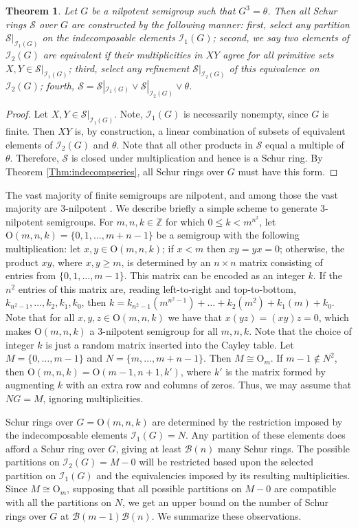 \documentclass{article}
\theoremstyle{plain}
\newtheorem{Thm}{Theorem}[section]
\theoremstyle{definition}
\newcommand{\thmref}[1]{Theorem \ref{#1}}
\renewcommand{\S}{\mathcal{S}}
\newcommand{\Z}{\mathbb{Z}}
\newcommand{\I}{\mathscr{I}}
\newcommand{\B}{\mathscr{B}}
\renewcommand{\O}{\mathrm{O}}
\begin{document}
\begin{Thm}\label{thm:nil3} Let $G$ be a nilpotent semigroup such that $G^3=\theta$. Then all Schur rings $\S$ over $G$ are constructed by the following manner: first, select any partition $\S|_{\I_1(G)}$ on the indecomposable elements $\I_1(G)$; second, we say two elements of $\I_2(G)$ are equivalent if their multiplicities in $XY$ agree for all primitive sets $X,Y\in \S|_{\I_1(G)}$; third, select any refinement $\S|_{\I_2(G)}$ of this equivalence on  $\I_2(G)$; fourth, $\S = \S|_{\I_1(G)}\vee \S|_{\I_2(G)}\vee \theta$.
\end{Thm}
\begin{proof}
    Let $X,Y\in \S|_{\I_1(G)}$. Note, $\I_1(G)$ is necessarily nonempty, since $G$ is finite. Then $XY$ is, by construction, a linear combination of subsets of equivalent elements of $\I_2(G)$ and $\theta$. Note that all other products in $\S$ equal a multiple of $\theta$. Therefore, $\S$ is closed under multiplication and hence is a Schur ring. By \thmref{Thm:indecompseries}, all Schur rings over $G$ must have this form.
\end{proof}

The vast majority of finite semigroups are nilpotent, and among those the vast majority are 3-nilpotent \cite{Distler}. We describe briefly a simple scheme to generate 3-nilpotent semigroups. For $m,n,k\in \Z$ for which $0\le k<m^{n^2}$, let \label{bigO}$\O(m,n,k) = \{0,1,\ldots, m+n-1\}$ be a semigroup with the following multiplication: let $x,y\in \O(m,n,k)$; if $x<m$ then $xy=yx=0$; otherwise, the product $xy$, where $x,y\ge m$, is determined by an $n\times n$ matrix consisting of entries from $\{0,1,\ldots, m-1\}$. This matrix can be encoded as an integer $k$. If the $n^2$ entries of this matrix are, reading left-to-right and top-to-bottom, $k_{n^2-1},\ldots, k_2, k_1, k_0$, then $k = k_{n^2-1}(m^{n^2-1}) + \ldots + k_2(m^2)+ k_1(m) + k_0$. Note that for all $x,y,z\in \O(m,n,k)$ we have that $x(yz) = (xy)z=0$, which makes $\O(m,n,k)$ a 3-nilpotent semigroup for all $m,n,k$. Note that the choice of integer $k$ is just a random matrix inserted into the Cayley table. Let $M=\{0,\ldots, m-1\}$ and $N=\{m,\ldots, m+n-1\}$. Then $M\cong \O_m$. If $m-1\notin N^2$, then $\O(m,n,k) = \O(m-1,n+1,k')$, where $k'$ is the matrix formed by augmenting $k$ with an extra row and columns of zeros. Thus, we may assume that $NG=M$, ignoring multiplicities.

Schur rings over $G=\O(m,n,k)$ are determined by the restriction imposed by the indecomposable elements $\I_1(G) = N$. Any partition of these elements does afford a Schur ring over $G$, giving at least $\B(n)$ many Schur rings. The possible partitions on $\I_2(G) = M-0$ will be restricted based upon the selected partition on $\I_1(G)$ and the equivalencies imposed by its resulting multiplicities.  Since $M\cong \O_m$, supposing that all possible partitions on $M-0$ are compatible with all the partitions on $N$, we get an upper bound on the number of Schur rings over $G$ at $\B(m-1)\B(n)$. We summarize these observations.
\end{document}

